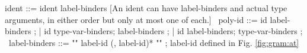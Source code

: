 \begin{syntax}
  ident ::= ident label-binders [An ident can have label-binders and actual type arguments, in either order but only at most one of each.]
  \
  poly-id ::= id label-binders ;
  | id type-var-binders;
    label-binders ;
  | id label-binders;
    type-var-binders ;
  \
  label-binders ::= "{" label-id (, label-id)* "}" ; label-id defined in Fig. \ref{fig:gram:at}
\end{syntax}
